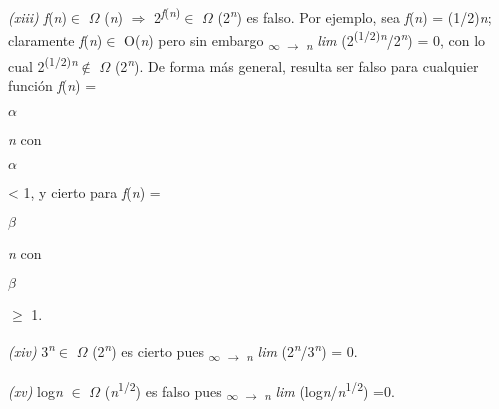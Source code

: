 \documentclass[12pt]{article}
\renewcommand{\_}{\kern-1.5pt\textunderscore\kern-1.5pt}
\begin{document}
\begin{adjustwidth}{0.58in}{0.57in}
\begin{justify}
{\fontsize{10pt}{12.0pt}\selectfont \textit{(xiii) f}(\textit{n})$ \in $ $ \Omega $ (\textit{n}) $ \Rightarrow $  2\textit{\textsuperscript{f}}\textsuperscript{(\textit{n})}$ \in $ $ \Omega $ (2\textit{\textsuperscript{n}}) es falso. Por ejemplo, sea \textit{f}(\textit{n}) = (1/2)\textit{n}; claramente \textit{f}(\textit{n})$ \in $ O(\textit{n}) pero sin embargo \textsubscript{$\infty$ $ \rightarrow $ \textit{n }}\textit{lim }(2\textsuperscript{(1/2)\textit{n}}/2\textit{\textsuperscript{n}}) = 0, con lo cual 2\textsuperscript{(1/2)\textit{n}}$ \notin $ $ \Omega $ (2\textit{\textsuperscript{n}}). De forma más general, resulta ser falso para cualquier función \textit{f}(\textit{n}) = {\fontsize{11pt}{13.2pt}\selectfont $ \alpha $ {\fontsize{10pt}{12.0pt}\selectfont \textit{n }con {\fontsize{11pt}{13.2pt}\selectfont $ \alpha $  {\fontsize{10pt}{12.0pt}\selectfont < 1, y cierto para \textit{f}(\textit{n}) = {\fontsize{11pt}{13.2pt}\selectfont $ \beta $ {\fontsize{10pt}{12.0pt}\selectfont \textit{n }con {\fontsize{11pt}{13.2pt}\selectfont $ \beta $  {\fontsize{10pt}{12.0pt}\selectfont $ \geq $  1. \par}\par}\par}\par}\par}\par}\par}\par}\par}
\end{justify}\par

\end{adjustwidth}

\begin{adjustwidth}{0.58in}{2.65in}
{\fontsize{10pt}{12.0pt}\selectfont \textit{(xiv) }3\textit{\textsuperscript{n}}$ \in $ $ \Omega $ (2\textit{\textsuperscript{n}}) es cierto pues \textsubscript{$\infty$ $ \rightarrow $ \textit{n }}\textit{lim }(2\textit{\textsuperscript{n}}/3\textit{\textsuperscript{n}}) = 0. \par}\par

\end{adjustwidth}

\begin{adjustwidth}{0.58in}{2.65in}
{\fontsize{10pt}{12.0pt}\selectfont \textit{(xv) }log\textit{n }$ \in $ $ \Omega $ (\textit{n}\textsuperscript{1/2}) es falso pues \textsubscript{$\infty$ $ \rightarrow $ \textit{n }}\textit{lim }(log\textit{n}/\textit{n}\textsuperscript{1/2}) =0. \par}\par

\end{adjustwidth}
\end{document}

